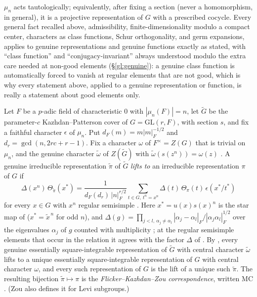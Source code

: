 \begin{description}
$\mu_n$ acts tautologically; equivalently, after fixing a section
(never a homomorphism, in general), it is a projective representation
of $G$ with a prescribed cocycle. Every general fact recalled above,
admissibility, finite-dimensionality modulo a compact center,
characters as class functions, Schur orthogonality, and germ
expansions, applies to genuine representations and genuine functions
exactly as stated, with ``class function'' and ``conjugacy-invariant''
always understood modulo the extra care needed at non-good elements
(\S\ref{gl:genuine}): a genuine class function is automatically
forced to vanish at regular elements that are not good, which is why
every statement above, applied to a genuine representation or
function, is really a statement about good elements only.
\item[Flicker--Kazhdan--Zou correspondence $\mathrm{MC}$]\label{gl:FKZ} Let $F$ be a $p$-adic field of characteristic $0$ with $|\mu_n(F)|=n$, let $\widetilde G$ be the parameter-$c$ Kazhdan--Patterson cover of $G=\mathrm{GL}(r,F)$, with section $s$, and fix a faithful character $\epsilon$ of $\mu_n$. Put $d_F(m)=m|m|_F^{-1/2}$ and $d_r=\gcd(n,2rc+r-1)$. Fix a character $\omega$ of $F^\times=Z(G)$ that is trivial on $\mu_n$, and the genuine character $\widetilde\omega$ of $Z(\widetilde G)$ with $\widetilde\omega(s(z^n))=\omega(z)$ \cite[(3.1)]{Zo23}. A genuine irreducible representation $\widetilde\pi$ of $\widetilde G$ \emph{lifts to} an irreducible representation $\pi$ of $G$ if
\[
\Delta(x^n)\,\Theta_{\widetilde\pi}(x^*)=\frac{1}{d_F(d_r)\,|n|_F^{r/2}}\sum_{t\in G,\ t^n=x^n}\Delta(t)\,\Theta_\pi(t)\,\epsilon(x^*/t^*)
\]
for every $x\in G$ with $x^n$ regular semisimple \cite[(3.2)]{Zo23}. Here $x^*=u(x)s(x)^n$ is the star map of \cite[\S4]{FK86} ($x^*=\tilde x^{\,n}$ for odd $n$), and $\Delta(g)=\prod_{j<l,\ \alpha_j\ne\alpha_l}|\alpha_j-\alpha_l|_F/|\alpha_j\alpha_l|_F^{1/2}$ over the eigenvalues $\alpha_j$ of $g$ counted with multiplicity \cite[\S3.1]{Zo23}; at the regular semisimple elements that occur in the relation it agrees with the factor $\Delta$ of \cite[\S6]{FK86}. By \cite[Proposition~3.6]{Zo23}, every genuine essentially square-integrable representation of $\widetilde G$ with central character $\widetilde\omega$ lifts to a unique essentially square-integrable representation of $G$ with central character $\omega$, and every such representation of $G$ is the lift of a unique such $\widetilde\pi$. The resulting bijection $\widetilde\pi\mapsto\pi$ is the \emph{Flicker--Kazhdan--Zou correspondence}, written $\mathrm{MC}$ \cite[Definition~3.7]{Zo23}. (Zou also defines it for Levi subgroups.)

\end{description}
